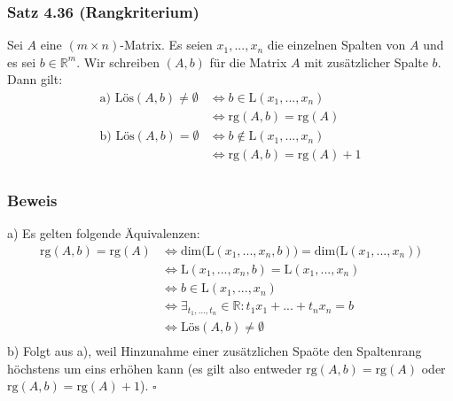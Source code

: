 \documentclass{article}
\begin{document}
\subsubsection*{Satz 4.36 (Rangkriterium)}
Sei $A$ eine $(m \times n)$-Matrix. Es seien $x_1,...,x_n$ die einzelnen Spalten von $A$ und es sei $b \in \mathbb{R}^m$. 
Wir schreiben $(A,b)$ für die Matrix $A$ mit zusätzlicher Spalte $b$. \\    
Dann gilt: \\
\begin{align*}
    \text{a) Lös}(A,b) \neq \emptyset &\Leftrightarrow b \in \text{L}(x_1,...,x_n) \\
    &\Leftrightarrow \text{rg}(A,b) = \text{rg}(A) \\
    \text{b) Lös}(A,b) = \emptyset &\Leftrightarrow b \notin \text{L}(x_1,...,x_n) \\
    &\Leftrightarrow \text{rg}(A,b) = \text{rg}(A) + 1 \\
\end{align*}
\subsubsection*{Beweis}
a) Es gelten folgende Äquivalenzen: \\
\begin{align*}
    \text{rg}(A,b) = \text{rg}(A) &\Leftrightarrow \text{dim(L}(x_1,...,x_n,b)) = \text{dim(L}(x_1,...,x_n)) \\
    &\Leftrightarrow \text{L}(x_1,...,x_n,b) = \text{L}(x_1,...,x_n) \\
    &\Leftrightarrow b \in \text{L}(x_1,...,x_n) \\
    &\Leftrightarrow \exists_{t_1, ..., t_n} \in \mathbb{R}: t_1 x_1 + ... + t_n x_n = b \\
    &\Leftrightarrow \text{Lös}(A,b) \neq \emptyset \\
\end{align*}
b) Folgt aus a), weil Hinzunahme einer zusätzlichen Spaöte den Spaltenrang höchstens um eins erhöhen kann (es gilt also entweder $\text{rg}(A,b) = \text{rg}(A)$ oder $\text{rg}(A,b) = \text{rg}(A) + 1$). $\square$ \\
\\
\end{document}
